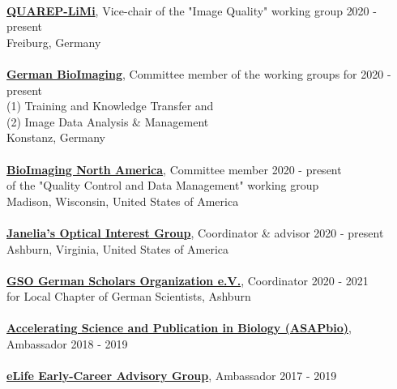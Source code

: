\documentclass[margin,line]{res}
\begin{document}
\begin{resume}
\vspace*{-3mm}\\
{\bf \href{https://quarep.org/}{QUAREP-LiMi}}, Vice-chair of the "Image Quality" working group  \hfill {2020 - present}\\
Freiburg, Germany\\
\vspace*{-3mm}\\
{\bf \href{https://www.gerbi-gmb.de/}{German BioImaging}}, Committee member of the working groups for \hfill {2020 - present}\\
 (1)  Training and Knowledge Transfer and\\
(2) Image Data Analysis \& Management\\
Konstanz, Germany\\
\vspace*{-3mm}\\
{\bf \href{https://www.bioimagingna.org/}{BioImaging North America}}, Committee member \hfill {2020 - present}\\
of the "Quality Control and Data Management" working group\\
Madison, Wisconsin, United States of America\\
\vspace*{-3mm}\\
{\bf \href{https://www.janelia.org/content/optical-interest-group}{Janelia's Optical Interest Group}}, Coordinator \& advisor  \hfill {2020 - present}\\
Ashburn, Virginia, United States of America\\
\vspace*{-3mm}\\
{\bf \href{https://www.gain-network.org/en/about-gain/gain-chapters/}{GSO German Scholars Organization e.V.}}, Coordinator  \hfill {2020 - 2021}\\
for Local Chapter of German Scientists, Ashburn\\
\vspace*{-3mm}\\
{\bf \href{https://asapbio.org/preprint-info/preprint-stories}{Accelerating Science and Publication in Biology (ASAPbio)}}, Ambassador \hfill {2018 - 2019}\\
\vspace*{-3mm}\\
{\bf \href{hhttps://elifesciences.org/inside-elife/912b0679/early-career-advisory-group-elife-welcomes-150-ambassadors-of-good-practice-in-science}{eLife Early-Career Advisory Group}}, Ambassador \hfill {2017 - 2019}\\

\end{resume}
\end{document}
